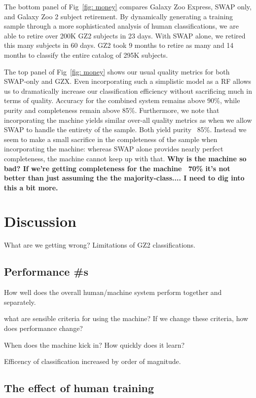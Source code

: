 \documentclass[twocolumn]{aastex6}
\begin{document}
The bottom panel of Fig~\ref{fig: money} compares  Galaxy Zoo Express, 
SWAP only, and Galaxy Zoo 2 subject retirement.
By dynamically generating a training sample
through a more sophisticated analysis of human classifications, we are able
to retire over 200K GZ2 subjects in 23 days.  With SWAP alone, we retired this
many subjects in 60 days. GZ2 took 9 months to retire as many and 14 months 
to classify the entire catalog of 295K subjects. 

The top panel of Fig~\ref{fig: money} shows our usual quality metrics for both 
SWAP-only and GZX.  Even incorporating such a simplistic model as a RF allows
us to dramatically increase our classification efficiency without sacrificing much 
in terms of quality. Accuracy for the combined system remains above 90\%, while
purity and completeness remain above 85\%. Furthermore, we note that 
incorporating the machine yields similar over-all quality metrics as when we 
allow SWAP to handle the entirety of the sample. Both yield purity ~85\%. 
Instead we seem to make a small sacrifice in the completeness of the sample
when incorporating the machine: whereas SWAP alone provides nearly perfect
completeness, the machine cannot keep up with that.
 \textbf{Why is the machine so bad? If we're getting completeness for the machine ~70\% it's not better than just assuming the the majority-class.... I need to dig into this a bit more.}



\section{Discussion}

What are we getting wrong? 
Limitations of GZ2 classifications. 


\subsection{Performance \#s}
How well does the overall human/machine system perform together and separately. 

what are sensible criteria for using the machine? If we change these criteria, how does performance change? 

When does the machine kick in? How quickly does it learn? 

Efficency of classification increased by order of magnitude. 


\subsection{The effect of human training}
\end{document}
